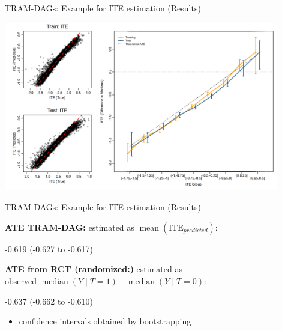 \documentclass[onlytextwidth,english]{beamer}\usepackage[]{graphicx}\usepackage[]{xcolor}
\begin{document}
\begin{frame}{TRAM-DAGs: Example for ITE estimation (Results)}


\centering
\includegraphics[width=0.9\textwidth]{img/observedITE_ATE_base.png}


\end{frame}




\begin{frame}{TRAM-DAGs: Example for ITE estimation (Results)}





\textbf{ATE TRAM-DAG:} estimated as $\operatorname{mean}(\text{ITE}_{predicted})$:


-0.619 (-0.627 to -0.617)

\vspace{1em}

\textbf{ATE from RCT (randomized:)} estimated as \\ 
observed $\operatorname{median}(Y \mid T = 1)$ - $\operatorname{median}(Y \mid T = 0)$:

-0.637 (-0.662 to -0.610)


\vspace{1em}

\begin{itemize}
    \item confidence intervals obtained by bootstrapping
\end{itemize}






\end{frame}
\end{document}
